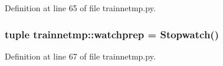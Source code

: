 Definition at line 65 of file trainnetmp.py.

\hypertarget{namespacetrainnetmp_a0207abb6efd09545a76548318d6af4cf}{
\subsubsection[{watchprep}]{\setlength{\rightskip}{0pt plus 5cm}tuple {\bf trainnetmp::watchprep} = Stopwatch()}}
\label{namespacetrainnetmp_a0207abb6efd09545a76548318d6af4cf}


Definition at line 67 of file trainnetmp.py.

